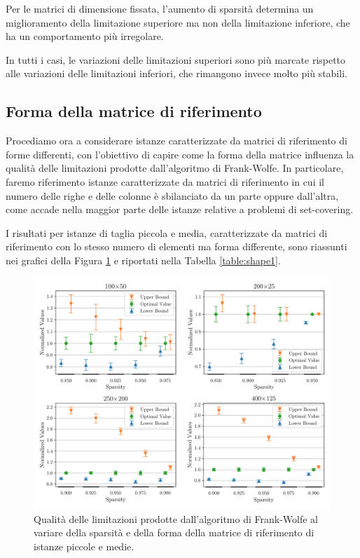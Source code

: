 Per le matrici di dimensione fissata, l'aumento di sparsità determina un miglioramento della limitazione superiore ma
non della limitazione inferiore, che ha un comportamento più irregolare.

In tutti i casi, le variazioni delle limitazioni superiori sono più marcate rispetto alle variazioni delle limitazioni
inferiori, che rimangono invece molto più stabili.

\subsection{Forma della matrice di riferimento}
Procediamo ora a considerare istanze caratterizzate da matrici di riferimento di forme differenti, con l'obiettivo di
capire come la forma della matrice influenza la qualità delle limitazioni prodotte dall'algoritmo di Frank-Wolfe. In
particolare, faremo riferimento istanze caratterizzate da matrici di riferimento in cui il numero delle righe e delle
colonne è sbilanciato da un parte oppure dall'altra, come accade nella maggior parte delle istanze relative a problemi
di set-covering.

I risultati per istanze di taglia piccola e media, caratterizzate da matrici di riferimento con lo stesso numero di
elementi ma forma differente, sono riassunti nei grafici della Figura \ref{fig:shape1} e riportati nella Tabella
\ref{table:shape1}.

\begin{figure}[ht]
    \centering
    \includegraphics[width=\textwidth]{assets/figures/shape1.pdf}
    \caption{Qualità delle limitazioni prodotte dall’algoritmo di Frank-Wolfe al variare della sparsità e della forma
    della matrice di riferimento di istanze piccole e medie.}
    \label{fig:shape1}
\end{figure}

